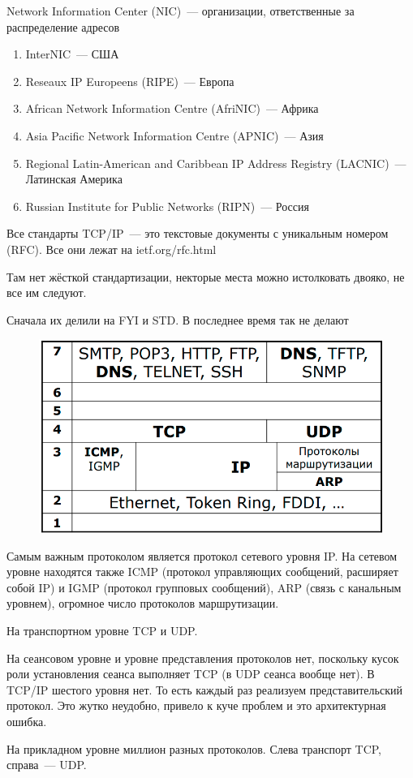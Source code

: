 
Network Information Center (NIC)~--- организации, ответственные за распределение адресов
\begin{enumerate}
    \item InterNIC~--- США
    \item Reseaux IP Europeens (RIPE)~--- Европа
    \item African Network Information Centre (AfriNIC)~--- Африка
    \item Asia Pacific Network Information Centre (APNIC)~--- Азия
    \item Regional Latin-American and Caribbean IP Address Registry (LACNIC)~--- Латинская Америка
    \item Russian Institute for Public Networks (RIPN)~--- Россия
\end{enumerate}


Все стандарты TCP/IP~--- это текстовые документы с уникальным номером (RFC). Все они лежат на ietf.org/rfc.html

Там нет жёсткой стандартизации, некторые места можно истолковать двояко, не все им следуют.

Сначала их делили на FYI и STD. В последнее время так не делают


\begin{figure}[H]
  \centering
  \includegraphics[width=15cm]{images/00/03}
\end{figure}

Самым важным протоколом является протокол сетевого уровня IP. На сетевом уровне находятся также ICMP (протокол управляющих сообщений, расширяет собой IP) и IGMP (протокол групповых сообщений), ARP (связь с канальным уровнем), огромное число протоколов маршрутизации.

На транспортном уровне TCP и UDP. 

На сеансовом уровне и уровне представления протоколов нет, поскольку кусок роли установления сеанса выполняет TCP (в UDP сеанса вообще нет). В TCP/IP шестого уровня нет. То есть каждый раз реализуем представительский протокол. Это жутко неудобно, привело к куче проблем и это архитектурная ошибка.

На прикладном уровне миллион разных протоколов. Слева транспорт TCP, справа~--- UDP. 
